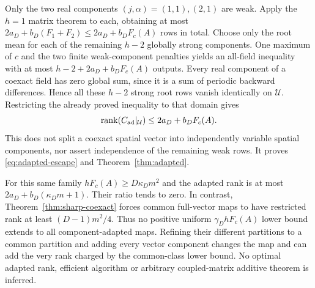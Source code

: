 Only the two real components $(j,\alpha)=(1,1),(2,1)$ are weak.
Apply the $h=1$ matrix theorem to each, obtaining at most
$2a_D+b_D(F_1+F_2)\le2a_D+b_DF_c(A)$ rows in total.
Choose only the root mean for each of the remaining $h-2$ globally strong
components. One maximum of $c$ and the two finite weak-component
penalties yields an all-field inequality with at most
$h-2+2a_D+b_DF_c(A)$ outputs.
Every real component of a coexact field has zero global sum, since it is
a sum of periodic backward differences. Hence all these $h-2$ strong
root rows vanish identically on $\mathcal U$. Restricting the already
proved inequality to that domain gives
\[
 \operatorname{rank}(C_{\rm ad}|_{\mathcal U})\le2a_D+b_DF_c(A).
\]
This does not split a coexact spatial vector into independently variable
spatial components, nor assert independence of the remaining weak rows.
It proves \eqref{eq:adapted-escape} and Theorem~\ref{thm:adapted}.

For this same family $hF_c(A)\ge D\kappa_Dm^2$ and the adapted rank is
at most $2a_D+b_D(\kappa_Dm+1)$. Their ratio tends to zero. In contrast,
Theorem~\ref{thm:sharp-coexact} forces common full-vector maps to have
restricted rank at least $(D-1)m^2/4$. Thus no positive uniform
$\gamma_DhF_c(A)$ lower bound extends to all component-adapted maps.
Refining their different partitions to a common partition and adding
every vector component changes the map and can add the very rank
charged by the common-class lower bound. No optimal adapted rank,
efficient algorithm or arbitrary coupled-matrix additive theorem is inferred.
